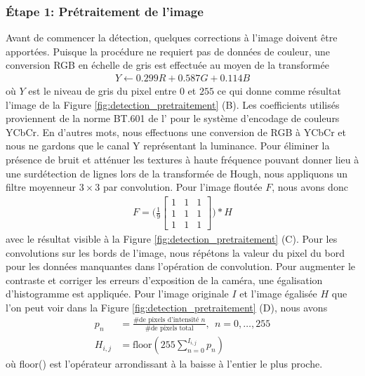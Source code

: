 \subsubsection{Étape 1: Prétraitement de l'image} Avant de commencer la détection, quelques corrections à l'image doivent être apportées. Puisque la procédure ne requiert pas de données de couleur, une conversion RGB en échelle de gris est effectuée au moyen de la transformée
\begin{align}
 Y \leftarrow 0.299 R + 0.587 G + 0.114 B
 \label{eq:rgb2gray}
\end{align}
où $Y$ est le niveau de gris du pixel entre $0$ et $255$ ce qui donne comme résultat l'image de la Figure \ref{fig:detection_pretraitement} (B). Les coefficients utilisés proviennent de la norme BT.601 de l'\cite{BT601Stu24online} pour le système d'encodage de couleurs YCbCr. En d'autres mots, nous effectuons une conversion de RGB à YCbCr et nous ne gardons que le canal Y représentant la luminance. Pour éliminer la présence de bruit et atténuer les textures à haute fréquence pouvant donner lieu à une surdétection de lignes lors de la transformée de Hough, nous appliquons un filtre moyenneur $3 \times 3$ par convolution. Pour l'image floutée $F$, nous avons donc
\begin{align}
  F = \Bigg(\frac{1}{9}
    \begin{bmatrix}
      1 & 1 & 1\\
      1 & 1 & 1\\
      1 & 1 & 1
    \end{bmatrix}
  \Bigg) * H
  \label{eq:boxfilter}
\end{align}
avec le résultat visible à la Figure \ref{fig:detection_pretraitement} (C). Pour les convolutions sur les bords de l'image, nous répétons la valeur du pixel du bord pour les données manquantes dans l'opération de convolution. Pour augmenter le contraste et corriger les erreurs d'exposition de la caméra, une égalisation d'histogramme est appliquée. Pour l'image originale $I$ et l'image égalisée $H$ que l'on peut voir dans la Figure \ref{fig:detection_pretraitement} (D), nous avons
\begin{align}
  p_n &= \frac{\text{\# de pixels d'intensité } n }{\text{\# de pixels total}}, \ \ n = 0, \ldots, 255 \\
  H_{i,j} &= \text{floor}(255 \sum_{n=0}^{I_{i,j}} p_n)
  \label{eq:egalisation_histogramme}
\end{align}
où floor() est l'opérateur arrondissant à la baisse à l'entier le plus proche.
